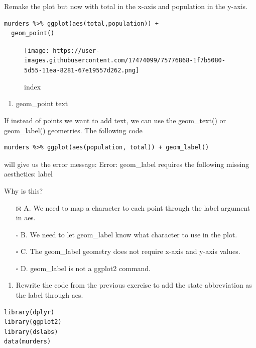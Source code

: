 \documentclass[
]{article}
\providecommand{\tightlist}{%
  \setlength{\itemsep}{0pt}\setlength{\parskip}{0pt}}
\begin{document}
Remake the plot but now with total in the x-axis and population in the
y-axis.

\begin{verbatim}
murders %>% ggplot(aes(total,population)) +
  geom_point()
\end{verbatim}

\begin{figure}
\centering
\texttt{[image: https://user-images.githubusercontent.com/17474099/75776868-1f7b5080-5d55-11ea-8281-67e19557d262.png]}
\caption{index}
\end{figure}

\begin{enumerate}
\def\labelenumi{\arabic{enumi}.}
\setcounter{enumi}{6}
\tightlist
\item
  geom\_point text
\end{enumerate}

If instead of points we want to add text, we can use the geom\_text() or
geom\_label() geometries. The following code

\begin{verbatim}
murders %>% ggplot(aes(population, total)) + geom_label()
\end{verbatim}

will give us the error message: Error: geom\_label requires the
following missing aesthetics: label

Why is this?

\begin{itemize}
\tightlist
\item[$\boxtimes$]
  A. We need to map a character to each point through the label argument
  in aes.
\item[$\square$]
  B. We need to let geom\_label know what character to use in the plot.
\item[$\square$]
  C. The geom\_label geometry does not require x-axis and y-axis values.
\item[$\square$]
  D. geom\_label is not a ggplot2 command.
\end{itemize}

\begin{enumerate}
\def\labelenumi{\arabic{enumi}.}
\setcounter{enumi}{7}
\tightlist
\item
  Rewrite the code from the previous exercise to add the state
  abbreviation as the label through aes.
\end{enumerate}

\begin{verbatim}
library(dplyr)
library(ggplot2)
library(dslabs)
data(murders)
\end{verbatim}
\end{document}
